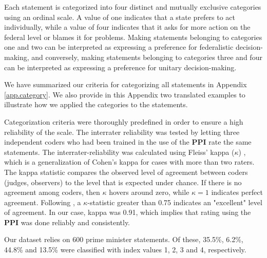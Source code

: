 \documentclass[12pt, abstracton]{scrartcl}
\begin{document}
Each statement is categorized into four distinct and mutually exclusive categories using an ordinal scale. A value of one indicates that a state prefers to act individually, while a value of four indicates that it asks for more action on the federal level or blames it for problems. Making statements belonging to categories one and two can be interpreted as expressing a preference for federalistic decision-making, and conversely, making statements belonging to categories three and four can be interpreted as expressing a preference for unitary decision-making.

We have summarized our criteria for categorizing all statements in Appendix \ref{app.category}. We also provide in this Appendix two translated examples to illustrate how we applied the categories to the statements.
%

Categorization criteria were thoroughly predefined in order to ensure a high reliability of the scale. The interrater reliability was tested by letting three independent coders who had been trained in the use of the \textbf{PPI} rate the same statements. %
The interrater-reliability was calculated using Fleiss’ kappa ($\kappa$) \citep[][Ch.~18]{Fleiss2003},
which is a generalization of Cohen’s kappa for cases with more than two raters. The kappa statistic compares the observed level of agreement between coders (judges, observers) to the level that is expected under chance. If there is no agreement among coders, then ${\kappa}$ hovers around zero, while ${\kappa}=1$ indicates perfect agreement. Following \cite{Fleiss2003}, a $\kappa$-statistic greater than 0.75 indicates an "excellent" level of agreement. In our case, kappa was 0.91, which implies that rating using the \textbf{PPI} was done reliably and consistently.

Our dataset relies on 600 prime minister statements. Of these, 35.5\%, 6.2\%, 44.8\% and 13.5\% were classified with index values 1, 2, 3 and 4, respectively.
\end{document}
